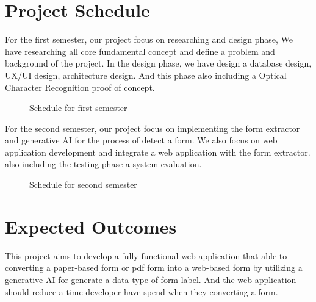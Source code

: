 \documentclass[12pt,oneside,openright,a4paper]{cpe-english-project}
\begin{document}
\section{Project Schedule}
For the first semester, our project focus on researching and design phase, We have researching all core fundamental concept and define a problem and background of the project. In the design phase, we have design a database design, UX/UI design, architecture design. And this phase also including a Optical Character Recognition proof of concept.

\begin{figure}[!h]
\centering
{}
\caption{Schedule for first semester}\label{fig:schedule-1}
\end{figure}

For the second semester, our project focus on implementing the form extractor and generative AI for the process of detect a form. We also focus on web application development and integrate a web application with the form extractor. also including the testing phase a system evaluation.

\begin{figure}[!h]
\centering
{}
\caption{Schedule for second semester}\label{fig:schedule-2}
\end{figure}

\section{Expected Outcomes}
This project aims to develop a fully functional web application that able to converting a paper-based form or pdf form into a web-based form by utilizing a generative AI for generate a data type of form label. And the web application should reduce a time developer have spend when they converting a form.
\end{document}
